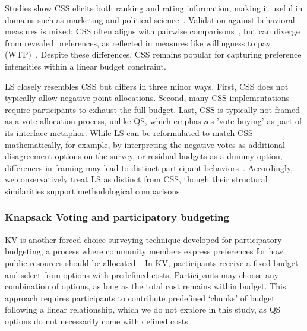 Studies show CSS elicits both ranking and rating information, making it useful in domains such as marketing and political science~\cite{collewet2023preference}. Validation against behavioral measures is mixed: CSS often aligns with pairwise comparisons~\cite{dudekValidityPointAssignmentProcedure1957}, but can diverge from revealed preferences, as reflected in measures like willingness to pay (WTP)~\cite{louviereComparisonImportanceWeights2008}. Despite these differences, CSS remains popular for capturing preference intensities within a linear budget constraint.

LS closely resembles CSS but differs in three minor ways. First, CSS does not typically allow negative point allocations. Second, many CSS implementations require participants to exhaust the full budget. Last, CSS is typically not framed as a vote allocation process, unlike QS, which emphasizes 'vote buying' as part of its interface metaphor. While LS can be reformulated to match CSS mathematically, for example, by interpreting the negative votes as additional disagreement options on the survey, or residual budgets as a dummy option, differences in framing may lead to distinct participant behaviors~\cite{shahScarcityFramesValue2015, kahnemanProspectTheoryAnalysis1979}. Accordingly, we conservatively treat LS as distinct from CSS, though their structural similarities support methodological comparisons.

\subsubsection{Knapsack Voting and participatory budgeting}
KV is another forced-choice surveying technique developed for participatory budgeting, a process where community members express preferences for how public resources should be allocated~\cite{goelKnapsackVotingParticipatory2019, goel2016budget}. In KV, participants receive a fixed budget and select from options with predefined costs. Participants may choose any combination of options, as long as the total cost remains within budget. This approach requires participants to contribute predefined `chunks' of budget following a linear relationship, which we do not explore in this study, as QS options do not necessarily come with defined costs.

